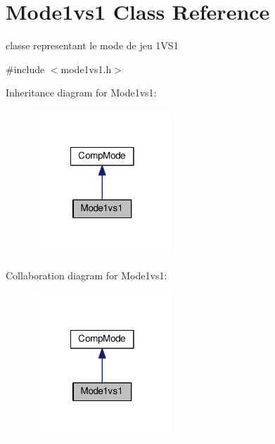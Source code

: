 \hypertarget{classMode1vs1}{\section{Mode1vs1 Class Reference}
\label{classMode1vs1}
}


classe representant le mode de jeu 1\+V\+S1  




{\ttfamily \#include $<$mode1vs1.\+h$>$}



Inheritance diagram for Mode1vs1\+:
\nopagebreak
\begin{figure}[H]
\begin{center}
\leavevmode
\includegraphics[width=146pt]{classMode1vs1__inherit__graph}
\end{center}
\end{figure}


Collaboration diagram for Mode1vs1\+:
\nopagebreak
\begin{figure}[H]
\begin{center}
\leavevmode
\includegraphics[width=146pt]{classMode1vs1__coll__graph}
\end{center}
\end{figure}
